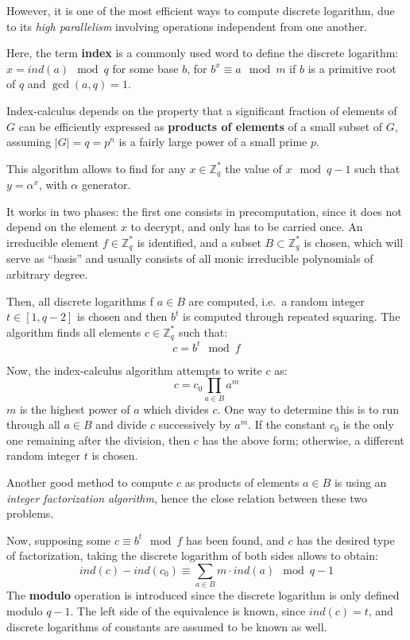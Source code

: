 However, it is one of the most efficient ways to compute discrete logarithm, due to its \textit{high parallelism} involving operations independent from one another. 

Here, the term \textbf{index} is a commonly used word to define the discrete logarithm: $x = ind(a) \mod q$ for some base $b$, for $b^x \equiv a \mod m$ if $b$ is a primitive root of $q$ and $\gcd(a, q) = 1$.

Index-calculus depends on the property that a significant fraction of elements of $G$ can be efficiently expressed as \textbf{products of elements} of a small subset of $G$, assuming $|G|= q = p^n$ is a fairly large power of a small prime $p$. 

This algorithm allows to find for any $x \in \mathbb{Z}^*_q$ the value of $x \mod q - 1$ such that $y = \alpha^x$, with $\alpha$ generator.

It works in two phases: the first one consists in precomputation, since it does not depend on the element $x$ to decrypt, and only has to be carried once. An irreducible element $f \in \mathbb{Z}^*_q$ is identified, and a subset $B \subset \mathbb{Z}^*_q$ is chosen, which will serve as ``basis'' and usually consists of all monic irreducible polynomials of arbitrary degree. 

Then, all discrete logarithms f $a \in B$ are computed, i.e.\ a random integer $t \in [1, q - 2]$ is chosen and then $b^t$ is computed through repeated squaring. The algorithm finds all elements $c \in \mathbb{Z}^*_q$ such that:
$$c = b^t \mod f$$

Now, the index-calculus algorithm attempts to write $c$ as:
$$c = c_0 \prod_{a \in B} a ^{m}$$
$m$ is the highest power of $a$ which divides $c$. One way to determine this is to run through all $a \in B$ and divide $c$ successively by $a^m$. If the constant $c_0$ is the only one remaining after the division, then $c$ has the above form; otherwise, a different random integer $t$ is chosen.

Another good method to compute $c$ as products of elements $a \in B$ is using an \textit{integer factorization algorithm}, hence the close relation between these two problems.

Now, supposing some $c \equiv b^t \mod f$ has been found, and $c$ has the desired type of factorization, taking the discrete logarithm of both sides allows to obtain:
$$ind(c) - ind(c_0) \equiv \sum_{a \in B} m \cdot ind(a) \mod q - 1$$
The \textbf{modulo} operation is introduced since the discrete logarithm is only defined modulo $q - 1$. The left side of the equivalence is known, since $ind(c) = t$, and discrete logarithms of constants are assumed to be known as well.

